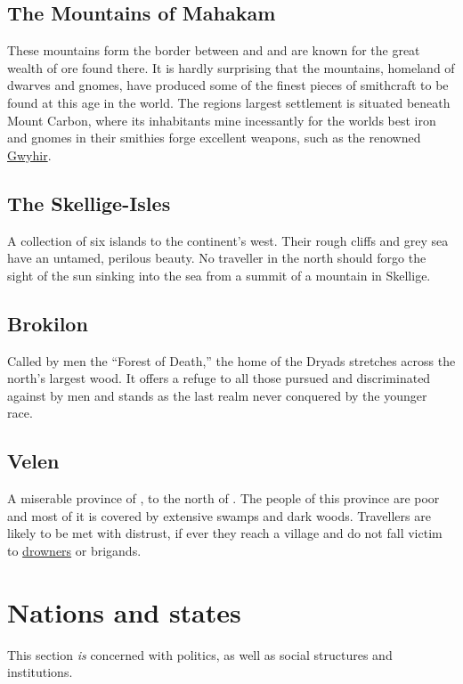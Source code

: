\documentclass[parskip=full,11pt,%
footheight=38pt]{scrreport}
\begin{document}
\subsection{The Mountains of Mahakam}\label{region:mahakamMtns}
These mountains form the border between  and  and are known for the great wealth
of ore found there. It is hardly surprising that the mountains, homeland of dwarves and gnomes, have produced some of the finest
pieces of smithcraft to be found at this age in the world. The regions largest settlement is situated beneath Mount Carbon,
where its inhabitants mine incessantly for the worlds best iron and gnomes in their smithies forge excellent weapons, such as
the renowned \hyperref[weapon:gwyhir]{Gwyhir}.

\subsection{The Skellige-Isles}\label{region:skellige}
A collection of six islands to the continent's west. Their rough cliffs and grey sea have an untamed, perilous beauty.
No traveller in the north should forgo the sight of the sun sinking into the sea from a summit of a mountain in Skellige.

\subsection{Brokilon}\label{region:brokilon}
Called by men the ``Forest of Death,'' the home of the Dryads stretches across the north's largest wood. It offers a refuge to
all those pursued and discriminated against by men and stands as the last realm never conquered by the younger race.

\subsection{Velen}\label{region:velen}
A miserable province of , to the north of . The people of this
province are poor and most of it is covered by extensive swamps and dark woods. Travellers are likely to be met
with distrust, if ever they reach a village and do not fall victim to \hyperref[monster:drowner]{drowners} or 
brigands.

\newpage

\section{Nations and states}
This section \textit{is} concerned with politics, as well as social structures and institutions.
\end{document}
